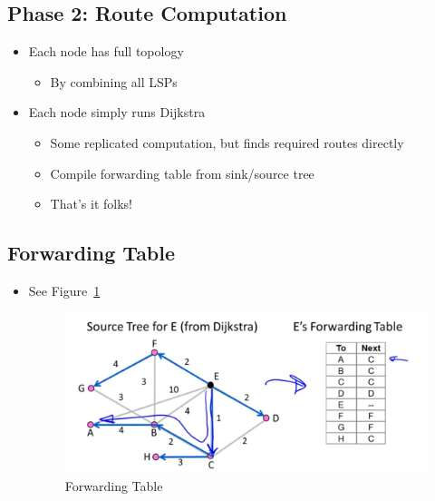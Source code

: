 \documentclass[12pt]{ctexart}   %
\begin{document}
	\subsection{Phase 2: Route Computation}
	\begin{itemize}
		\item Each node has full topology
		\begin{itemize}
			\item By combining all LSPs
		\end{itemize}
		
		\item Each node simply runs Dijkstra
		\begin{itemize}
			\item Some replicated computation, but finds required routes directly
			\item Compile forwarding table from sink/source tree
			\item That's it folks!
		\end{itemize}
	\end{itemize}
	
	\subsection{Forwarding Table}
	\begin{itemize}
		\item See Figure~\ref{fig:5-6-2}
			
		\begin{figure}[h!] %
		\centering
		 \includegraphics[scale=0.7]{images/5-6-2}
		\caption{ Forwarding Table }
		 \label{fig:5-6-2}
		 \end{figure}
	\end{itemize}
	
\end{document}
